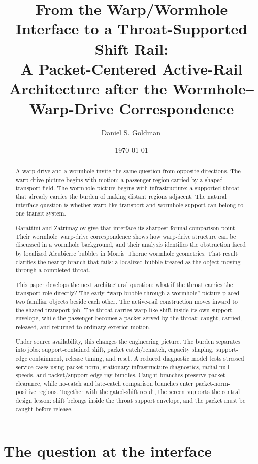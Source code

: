 \documentclass[11pt]{article}
\title{From the Warp/Wormhole Interface to a Throat-Supported Shift Rail:\\A Packet-Centered Active-Rail Architecture after the Wormhole--Warp-Drive Correspondence}
\author[1]{Daniel S. Goldman\,\orcidlink{0000-0003-2835-3521}}
\affil[1]{Independent researcher; ORCID: \href{https://orcid.org/0000-0003-2835-3521}{0000-0003-2835-3521}}
\date{\today}
\begin{document}
\maketitle


\begin{abstract}
A warp drive and a wormhole invite the same question from opposite directions. The warp-drive picture begins with motion: a passenger region carried by a shaped transport field. The wormhole picture begins with infrastructure: a supported throat that already carries the burden of making distant regions adjacent. The natural interface question is whether warp-like transport and wormhole support can belong to one transit system.

Garattini and Zatrimaylov give that interface its sharpest formal comparison point. Their wormhole--warp-drive correspondence shows how warp-drive structure can be discussed in a wormhole background, and their analysis identifies the obstruction faced by localized Alcubierre bubbles in Morris--Thorne wormhole geometries. That result clarifies the nearby branch that fails: a localized bubble treated as the object moving through a completed throat.

This paper develops the next architectural question: what if the throat carries the transport role directly? The early ``warp bubble through a wormhole'' picture placed two familiar objects beside each other. The active-rail construction moves inward to the shared transport job. The throat carries warp-like shift inside its own support envelope, while the passenger becomes a packet served by the throat: caught, carried, released, and returned to ordinary exterior motion.

Under source availability, this changes the engineering picture. The burden separates into jobs: support-contained shift, packet catch/rematch, capacity shaping, support-edge containment, release timing, and reset. A reduced diagnostic model tests stressed service cases using packet norm, stationary infrastructure diagnostics, radial null speeds, and packet/support-edge ray bundles. Caught branches preserve packet clearance, while no-catch and late-catch comparison branches enter packet-norm-positive regions. Together with the gated-shift result, the screen supports the central design lesson: shift belongs inside the throat support envelope, and the packet must be caught before release.
\end{abstract}

\section{The question at the interface}
\end{document}
